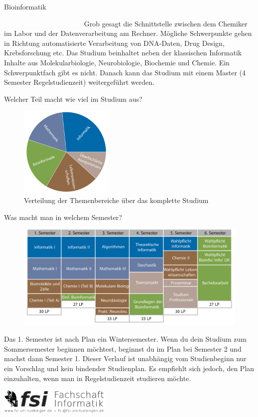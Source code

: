 	\begin{Huge}
				Bioinformatik
			\end{Huge}
			\begin{exampleblock}{\textcolor{white}{Was ist der Studiengang?}}
				Grob gesagt die Schnittstelle zwischen dem Chemiker im Labor und der Datenverarbeitung am Rechner. Mögliche Schwerpunkte gehen in Richtung automatisierte Verarbeitung von DNA-Daten, Drug Design, Krebsforschung etc.
				Das Studium beinhaltet neben der klassischen Informatik Inhalte aus Molekularbiologie, Neurobiologie, Biochemie und Chemie. Ein Schwerpunktfach gibt es nicht. Danach kann das Studium mit einem Master (4 Semester Regelstudienzeit) weitergeführt werden.
			\end{exampleblock}
			\begin{block}{Welcher Teil macht wie viel im Studium aus?}
				\begin{figure}[h!]
						\includegraphics[width=0.4\textwidth]{charts/bioinformatik-Piechart.pdf}
					\caption{Verteilung der Themenbereiche über das komplette Studium}
				\end{figure}
			\end{block}
		\begin{block}{Was macht man in welchem Semester?}
			\begin{figure}[h!]
					\includegraphics[width=\textwidth]{charts/bioinformatik-Studienplan_abWS18.pdf}
			\end{figure}
		Das 1. Semester ist nach Plan ein Wintersemester. Wenn du dein Studium zum Sommersemester beginnen möchtest, beginnst du im Plan bei Semester 2 und machst dann Semester 1. 
		Dieser Verlauf ist unabhängig vom Studienbeginn nur ein Vorschlag und kein bindender Studienplan. Es empfiehlt sich jedoch, den Plan einzuhalten, wenn man in Regelstudienzeit studieren möchte.
		\end{block}
	\vfill
	\begin{flushright}
		\includegraphics[width=0.4\textwidth]{fsilogo.pdf}
	\end{flushright}